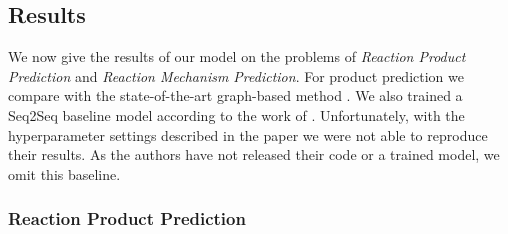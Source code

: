 \subsection{Results}
We now give the results of our model on the problems of \emph{Reaction Product Prediction} and \emph{Reaction Mechanism Prediction}. For product prediction we compare with the state-of-the-art graph-based method \cite{jin2017predicting}. We also trained a Seq2Seq baseline model according to the work of \cite{schwaller2017found}. Unfortunately, with the hyperparameter settings described in the paper we were not able to reproduce their results. As the authors have not released their code or a trained model, we omit this baseline.

\subsubsection*{Reaction Product Prediction}



